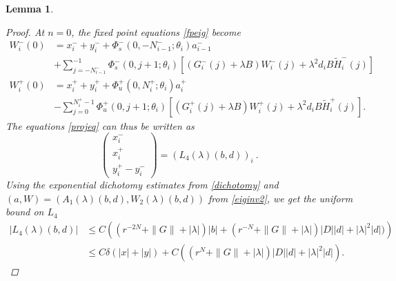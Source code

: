 \documentclass[12pt]{elsarticle}
\newtheorem{lemma}{Lemma}
\begin{document}
\begin{lemma}
\begin{proof}
At $n = 0$, the fixed point equations \cref{fpeig} become 
\begin{align*}
W_i^-(0) &= x_i^- + y_i^- +
\Phi_s^-(0, -N_{i-1}^-; \theta_i) a_{i-1}^- \\
&+ \sum_{j = -N_{i-1}^-}^{-1} \Phi_s^-(0, j+1; \theta_i)
[(G_i^-(j) + \lambda B) W_i^-(j) + \lambda^2 d_i B \tilde{H}_i^-(j)] \\
W_i^+(0) &= x_i^+ + y_i^+ + \Phi_u^+(0, N_i^+; \theta_i) a_i^+ \\
&- \sum_{j = 0}^{N_i^+-1} \Phi_u^+(0, j+1; \theta_i) 
[(G_i^+(j) + \lambda B) W_i^+(j) + \lambda^2 d_i B \tilde{H}_i^+(j)].
\end{align*}
The equations \cref{projeq} can thus be written as
\begin{equation}\label{projeq2}
\begin{pmatrix}
x_i^- \\ x_i^+ \\ y_i^+ - y_i^-
\end{pmatrix}
= (L_4(\lambda)(b,d))_i \:.
\end{equation}
Using the exponential dichotomy estimates from \cref{dichotomy} and $(a, W) = (A_1(\lambda)(b,d), W_2(\lambda)(b,d))$ from \cref{eiginv2}, we get the uniform bound on $L_4$
\begin{align*}
|L_4(\lambda)(b,d)| 
&\leq C \left( (r^{-2N} + \|G\| + |\lambda|)|b| + 
(r^{-N} + \|G\| + |\lambda|)|D| |d| + |\lambda|^2 |d| )
\right) \\
&\leq C \delta(|x| + |y|) + C \left( (r^{N} + \|G\| + |\lambda|)|D| |d| + |\lambda|^2 |d| \right).
\end{align*}


\end{proof}
\end{lemma}
\end{document}
